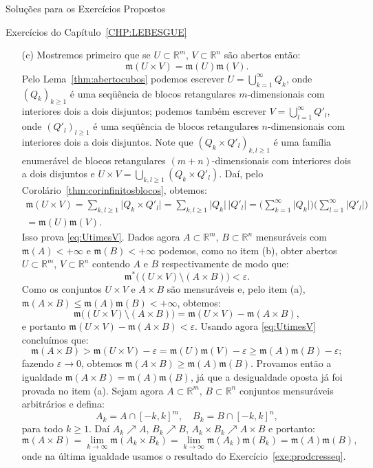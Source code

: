 \documentclass[oneside,final,11pt]{amsbook}
\newcommand{\R}{\mathds R}
\newcommand{\leb}{\mathfrak m}
\theoremstyle{remark}\newtheorem{exercise}{Exercício}[chapter]
\theoremstyle{remark}\newtheorem{*exercise}[exercise]{\hbox to 0pt{\hskip 0pt minus 1fil*}Exercício}
\theoremstyle{definition}\newtheorem{exdefin}{Definição}[chapter]
\theoremstyle{plain}\newtheorem{teo}{Teorema}[section]
\theoremstyle{plain}\newtheorem{lem}[teo]{Lema}
\theoremstyle{plain}\newtheorem{prop}[teo]{Proposição}
\theoremstyle{plain}\newtheorem{cor}[teo]{Corolário}
\theoremstyle{definition}\newtheorem{defin}[teo]{Definição}
\theoremstyle{remark}\newtheorem{rem}[teo]{Observação}
\theoremstyle{definition}\newtheorem{notation}[teo]{Notação}
\theoremstyle{definition}\newtheorem{convention}[teo]{Convenção}
\theoremstyle{definition}\newtheorem{example}[teo]{Exemplo}
\numberwithin{section}{chapter}
\numberwithin{equation}{section}
\begin{document}
\begin{chapter}{Soluções para os Exercícios Propostos}
\begin{section}{Exercícios do Capítulo~\ref{CHP:LEBESGUE}}
\begin{itemize}
\item[(c)] Mostremos primeiro que se $U\subset\R^m$, $V\subset\R^n$ são abertos então:
\begin{equation}\label{eq:UtimesV}
\leb(U\times V)=\leb(U)\leb(V).
\end{equation}
Pelo Lema~\ref{thm:abertocubos} podemos escrever $U=\bigcup_{k=1}^\infty Q_k$, onde $(Q_k)_{k\ge1}$ é uma seqüência
de blocos retangulares $m$-dimensionais com interiores dois a dois disjuntos; podemos também escrever $V=\bigcup_{l=1}^\infty Q'_l$,
onde $(Q'_l)_{l\ge1}$ é uma seqüência de blocos retangulares $n$-dimensionais com interiores dois a dois disjuntos.
Note que $(Q_k\times Q'_l)_{k,l\ge1}$ é uma família enumerável de blocos retangulares $(m+n)$-dimensionais com interiores
dois a dois disjuntos e $U\times V=\bigcup_{k,l\ge1}(Q_k\times Q'_l)$. Daí, pelo Corolário~\ref{thm:corinfinitosblocos}, obtemos:
\begin{multline*}
\leb(U\times V)=\sum_{k,l\ge1}\vert Q_k\times Q'_l\vert=\sum_{k,l\ge1}\vert Q_k\vert\,\vert Q'_l\vert
=\Big(\sum_{k=1}^\infty\vert Q_k\vert\Big)\Big(\sum_{l=1}^\infty\vert Q'_l\vert\Big)\\=\leb(U)\leb(V).
\end{multline*}
Isso prova \eqref{eq:UtimesV}.
Dados agora $A\subset\R^m$, $B\subset\R^n$ mensuráveis com $\leb(A)<+\infty$ e $\leb(B)<+\infty$ podemos,
como no item (b), obter abertos $U\subset\R^m$, $V\subset\R^n$ contendo $A$ e $B$ respectivamente de modo que:
\[\leb^*\big((U\times V)\setminus(A\times B)\big)<\varepsilon.\]
Como os conjuntos $U\times V$ e $A\times B$ são mensuráveis e, pelo item (a), $\leb(A\times B)\le\leb(A)\leb(B)<+\infty$,
obtemos:
\[\leb\big((U\times V)\setminus(A\times B)\big)=\leb(U\times V)-\leb(A\times B),\]
e portanto $\leb(U\times V)-\leb(A\times B)<\varepsilon$. Usando agora \eqref{eq:UtimesV} concluímos que:
\[\leb(A\times B)>\leb(U\times V)-\varepsilon=\leb(U)\leb(V)-\varepsilon\ge\leb(A)\leb(B)-\varepsilon;\]
fazendo $\varepsilon\to0$, obtemos $\leb(A\times B)\ge\leb(A)\leb(B)$. Provamos então a igualdade
$\leb(A\times B)=\leb(A)\leb(B)$, já que a desigualdade oposta já foi provada no item (a).
Sejam agora $A\subset\R^m$, $B\subset\R^n$ conjuntos mensuráveis arbitrários e defina:
\[A_k=A\cap[-k,k]^m,\quad B_k=B\cap[-k,k]^n,\]
para todo $k\ge1$. Daí $A_k\nearrow A$, $B_k\nearrow B$, $A_k\times B_k\nearrow A\times B$ e portanto:
\[\leb(A\times B)=\lim_{k\to\infty}\leb(A_k\times B_k)=\lim_{k\to\infty}\leb(A_k)\leb(B_k)
=\leb(A)\leb(B),\]
onde na última igualdade usamos o resultado do Exercício~\ref{exe:prodcresseq}.
\end{itemize}


\end{section}
\end{chapter}
\end{document}
